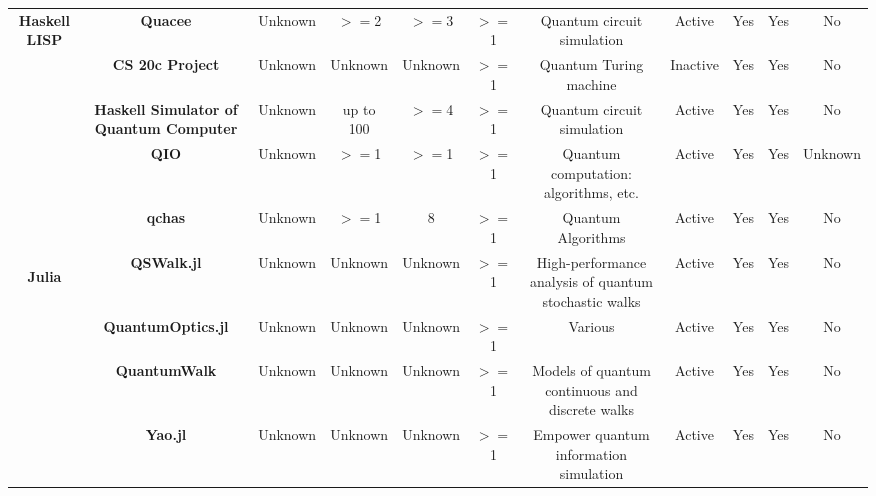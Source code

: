 \documentclass[conference]{IEEEtran}
\begin{document}
\begin{table*}[h!]
{\begin{tabular}{c|c|c|c|c|c|c|c|c|c|c}
	\multirow{5}{*}{\textbf{Haskell LISP}} & \textbf{Quacee } & Unknown &$>=$2  &$>=$3  &$>=$1  & Quantum circuit simulation & Active & Yes   & Yes   & No \\
	           & \textbf{CS 20c Project } & Unknown & Unknown & Unknown &$>=$1  & Quantum Turing machine & Inactive & Yes   & Yes   & No \\
	           & \textbf{Haskell Simulator of Quantum Computer } & Unknown & up to 100 &$>=$4  &$>=$1  & Quantum circuit simulation & Active & Yes   & Yes   & No \\
	           & \textbf{QIO } & Unknown &$>=$1  &$>=$1  &$>=$1  & Quantum computation: algorithms, etc. & Active & Yes   & Yes   & Unknown \\
	           & \textbf{qchas } & Unknown &$>=$1  & 8     &$>=$1  & Quantum Algorithms & Active & Yes   & Yes   & No \\ \hline
	
	
	
		\multirow{4}{*}{\begin{sideways}\textbf{Julia}\end{sideways}} & \textbf{QSWalk.jl } & Unknown & Unknown & Unknown &$>=$1  & High-performance analysis of quantum stochastic walks & Active & Yes   & Yes   & No \\
	           & \textbf{QuantumOptics.jl } & Unknown & Unknown & Unknown &$>=$1  & Various & Active & Yes   & Yes   & No \\
	           & \textbf{QuantumWalk } & Unknown & Unknown & Unknown &$>=$1  & Models of quantum continuous and discrete walks & Active & Yes   & Yes  & No \\
	           & \textbf{Yao.jl } & Unknown & Unknown & Unknown &$>=$1  &  Empower quantum information simulation & Active & Yes   & Yes & No \\
	\hline
	

\end{tabular}}
\end{table*}
\end{document}
